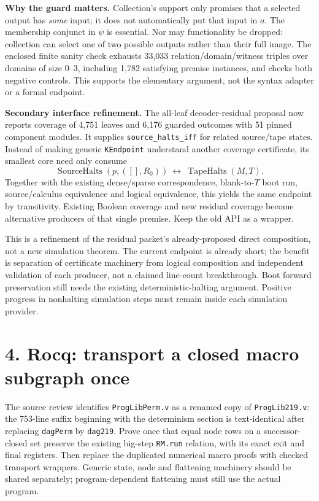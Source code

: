 \documentclass[10pt]{article}
\newcommand{\code}[1]{\texttt{#1}}
\begin{document}
\textbf{Why the guard matters.} Collection's support only promises that a selected output has \emph{some} input; it does not automatically put that input in $a$. The membership conjunct in $\psi$ is essential. Nor may functionality be dropped: collection can select one of two possible outputs rather than their full image. The enclosed finite sanity check exhausts 33,033 relation/domain/witness triples over domains of size 0--3, including 1,782 satisfying premise instances, and checks both negative controls. This supports the elementary argument, not the syntax adapter or a formal endpoint.

\textbf{Secondary interface refinement.} The all-leaf decoder-residual proposal now reports coverage of 4,751 leaves and 6,176 guarded outcomes with 51 pinned component modules. It supplies \code{source\_halts\_iff} for related source/tape states. Instead of making generic \code{KEndpoint} understand another coverage certificate, its smallest core need only consume
\[
\operatorname{SourceHalts}(p,([],R_0))\ \longleftrightarrow\
\operatorname{TapeHalts}(M,T).
\]
Together with the existing dense/sparse correspondence, blank-to-$T$ boot run, source/calculus equivalence and logical equivalence, this yields the same endpoint by transitivity. Existing Boolean coverage and new residual coverage become alternative producers of that single premise. Keep the old API as a wrapper.

This is a refinement of the residual packet's already-proposed direct composition, not a new simulation theorem. The current endpoint is already short; the benefit is separation of certificate machinery from logical composition and independent validation of each producer, not a claimed line-count breakthrough. Boot forward preservation still needs the existing deterministic-halting argument. Positive progress in nonhalting simulation steps must remain inside each simulation provider.

\section*{4. Rocq: transport a closed macro subgraph once}
The source review identifies \code{ProgLibPerm.v} as a renamed copy of \code{ProgLib219.v}: the 753-line suffix beginning with the determinism section is text-identical after replacing \code{dagPerm} by \code{dag219}. Prove once that equal node rows on a successor-closed set preserve the existing big-step \code{RM.run} relation, with its exact exit and final registers. Then replace the duplicated numerical macro proofs with checked transport wrappers. Generic state, node and flattening machinery should be shared separately; program-dependent flattening must still use the actual program.
\newpage
\end{document}
